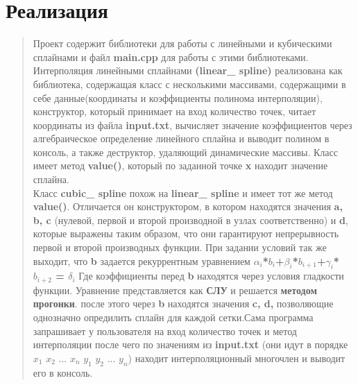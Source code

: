 \documentclass{article}
\begin{document}
\section{Реализация}
\begin{quotation}

	Проект содержит библиотеки для работы с линейными и кубическими сплайнами и файл \textbf{main.cpp} для работы с этими библиотеками.\\

	 Интерполяция линейными сплайнами \textbf{(linear\_ spline)} реализована как библиотека, содержащая класс с несколькими массивами, содержащими в себе данные(координаты и коэффициенты полинома интерполяции), конструктор, который принимает на вход количество точек, читает координаты из файла \textbf{input.txt}, вычисляет значение коэффициентов через алгебраическое определение линейного сплайна и выводит полином в консоль, а также деструктор, удаляющий динамические массивы. Класс имеет метод \textbf{value()}, который по заданной точке \textbf{x} находит значение сплайна.\\
	 
	 	  
	Класс \textbf{cubic\_ spline} похож на \textbf{linear\_ spline} и имеет тот же метод \textbf{value()}. Отличается он конструктором, в котором находятся значения \textbf{a, b, c} (нулевой, первой и второй производной в узлах соответственно) и \textbf{d}, которые выражены таким образом, что они гарантируют непрерывность первой и второй производных функции. При задании условий так же выходит, что \textbf{b} задается рекуррентным уравнением \textbf{$\alpha_i$*$b_i$+$\beta_i$*$b_{i+1}$+$\gamma_i$*$b_{i+2}$ = $\delta_i$} Где коэффициенты перед \textbf{b} находятся через условия гладкости функции. Уравнение представляется как \textbf{СЛУ} и решается \textbf{методом прогонки}. после этого через \textbf{b} находятся значения \textbf{c, d,} позволяющие однозначно опредилить сплайн для каждой сетки.Сама программа запрашивает у пользователя на вход количество точек и метод интерполяции после чего по значениям из \textbf{input.txt} (они идут в порядке $x_1$ $x_2$ ... $x_n$ $y_1$ $y_2$ ... $y_n$) находит интерполяционный многочлен и выводит его в консоль.

\end{quotation}
\end{document}
